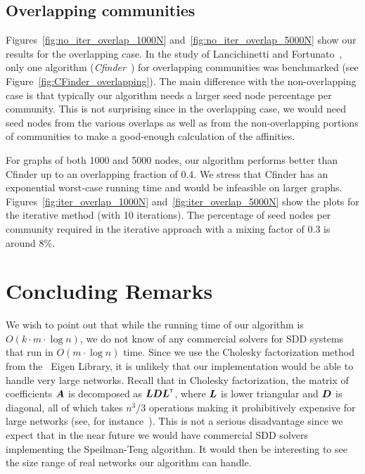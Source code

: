 \subsection{Overlapping communities}
Figures~\ref{fig:no_iter_overlap_1000N} and~\ref{fig:no_iter_overlap_5000N} 
show our results for the overlapping case. In the study of Lancichinetti and Fortunato~\cite{LF09}, 
only one algorithm (\emph{Cfinder}~\cite{PDFV05}) for overlapping communities was benchmarked 
(see Figure~\ref{fig:CFinder_overlapping}). 
The main difference with the non-overlapping case is that typically our algorithm needs a larger 
seed node percentage per community. This is not surprising since in the overlapping case, we would 
need seed nodes from the various overlaps as well as from the non-overlapping portions of communities 
to make a good-enough calculation of the affinities. 

For graphs of both 1000 and 5000 nodes, our algorithm performs better 
than Cfinder up to an overlapping fraction of $0.4$. We stress that Cfinder 
has an exponential worst-case running time and would be infeasible on larger graphs. 
%
Figures~\ref{fig:iter_overlap_1000N} and~\ref{fig:iter_overlap_5000N} show the 
plots for the iterative method (with 10 iterations). 
The percentage of seed nodes per community required in the 
iterative approach with a mixing factor of $0.3$ is around 8$\%$. 

\section{Concluding Remarks}

We wish to point out that while the running time of our algorithm is 
$O(k \cdot m \cdot \log n)$, we do not know of any commercial solvers 
for SDD systems that run in $O(m \cdot \log n)$ time. Since we use the Cholesky 
factorization method from the \CPP\ Eigen Library, it is unlikely that our 
implementation would be able to handle very large networks. Recall that 
in Cholesky factorization, the matrix of coefficients $\boldsymbol{A}$ is decomposed 
as $\boldsymbol{L} \boldsymbol{D} {\boldsymbol{L}}^{\scriptscriptstyle \mathsf{T}}$, where $\boldsymbol{L}$ is lower triangular 
and $\boldsymbol{D}$ is diagonal, all of which takes $n^3/3$ operations making it 
prohibitively expensive for large networks (see, for instance~\cite{GvL13}). 
This is not a serious disadvantage since we expect that in the near future 
we would have commercial SDD solvers implementing the Speilman-Teng algorithm. 
It would then be interesting to see the size range of real networks our algorithm 
can handle. 





